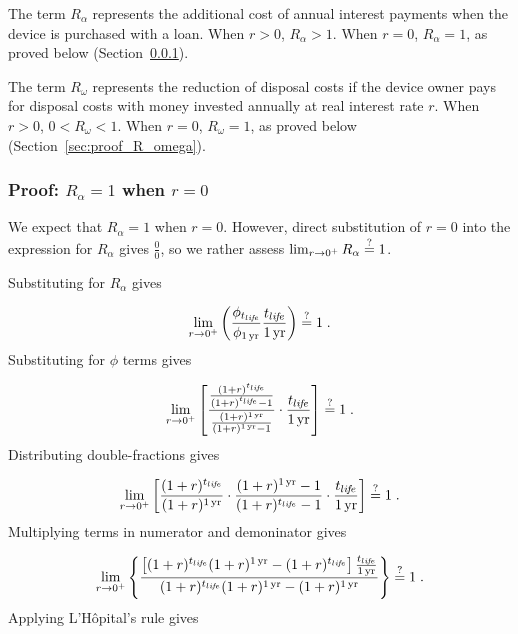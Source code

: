 The term $R_\alpha$ represents the additional cost of annual interest
payments when the device is purchased with a loan.
When $r > 0$, $R_\alpha > 1$.
When $r = 0$, $R_\alpha = 1$, as proved below
(Section~\ref{sec:proof_R_alpha}).

The term $R_\omega$ represents the reduction of disposal costs 
if the device owner pays for disposal costs with money
invested annually at real interest rate $r$. 
When $r > 0$, $0 < R_\omega < 1$.
When $r = 0$, $R_\omega = 1$, as proved below
(Section~\ref{sec:proof_R_omega}).


\subsubsection{Proof: $R_\alpha = 1$ when $r = 0$}
\label{sec:proof_R_alpha}

We expect that $R_\alpha = 1$ when $r = 0$.
However, direct substitution of $r = 0$ into the expression
for $R_\alpha$ gives $\frac{0}{0}$, 
so we rather assess
$\lim_{r \to 0^+} R_\alpha \stackrel{?}{=} 1$.

Substituting for $R_\alpha$ gives

\begin{equation}
  \lim_{r \to 0^+} \left( \frac{\phi_{t_{li\!f\!e}}}{\phi_{1\,\mathrm{yr}}} \frac{t_{li\!f\!e}}{1\,\mathrm{yr}} \right) 
  \stackrel{?}{=} 1 \; .
\end{equation}
%
Substituting for $\phi$ terms gives

\begin{equation}
  \lim_{r \to 0^+} \left[ \frac{\frac{(1 + r)^{t_{li\!f\!e}}}{(1 + r)^{t_{li\!f\!e}} - 1}}{\frac{(1 + r)^{1\,\mathrm{yr}}}{(1 + r)^{1\,\mathrm{yr}} - 1}} \cdot \frac{t_{li\!f\!e}}{1\,\mathrm{yr}} \right] \stackrel{?}{=} 1 \; .
\end{equation}
%
Distributing double-fractions gives

\begin{equation}
  \lim_{r \to 0^+} \left[
  \frac{(1 + r)^{t_{li\!f\!e}}}{(1 + r)^{1\,\mathrm{yr}}} \cdot
  \frac{(1 + r)^{1\,\mathrm{yr}} - 1}{(1 + r)^{t_{li\!f\!e}} - 1} \cdot
  \frac{t_{li\!f\!e}}{1\,\mathrm{yr}}
  \right] \stackrel{?}{=} 1 \; .
\end{equation}
%
Multiplying terms in numerator and demoninator gives

\begin{equation}
  \lim_{r \to 0^+} \left\{
  \frac{\left[(1 + r)^{\tlife} (1 + r)^{\oneyr} - (1 + r)^{\tlife} \right] \frac{\tlife}{\oneyr}}{(1 + r)^{\tlife} (1 + r)^{\oneyr} - (1 + r)^{\oneyr}}
  \right\} \questionequal 1 \; .
\end{equation}
%
Applying L'H\^{o}pital's rule gives


